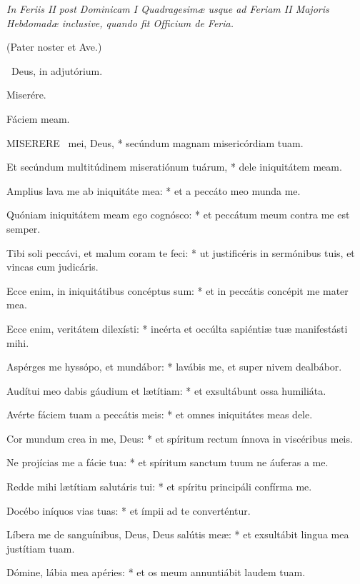 
\sectionornament


\textit{In Feriis II post Dominicam I Quadragesimæ usque ad Feriam II Majoris Hebdomadæ inclusive, quando fit Officium de Feria.}

(Pater noster et Ave.)

\V\ Deus, in adjutórium.

 Miserére. \textdagger


 Fáciem meam.


\lettrine[lines=2]{M}{ISERERE} \textdagger\ mei, Deus, * secúndum magnam misericórdiam tuam.

Et secúndum multitúdinem miseratiónum tuárum, * dele iniquitátem meam.

Amplius lava me ab iniquitáte mea: * et a peccáto meo munda me.

Quóniam iniquitátem meam ego cognósco: * et peccátum meum contra me est semper.

Tibi soli peccávi, et malum coram te feci: * ut justificéris in sermónibus tuis, et vincas cum judicáris.

Ecce enim, in iniquitátibus concéptus sum: * et in peccátis concépit me mater mea.

Ecce enim, veritátem dilexísti: * incérta et occúlta sapiéntiæ tuæ manifestásti mihi.

Aspérges me hyssópo, et mundábor: * lavábis me, et super nivem dealbábor.

Audítui meo dabis gáudium et lætítiam: * et exsultábunt ossa humiliáta.

Avérte fáciem tuam a peccátis meis: * et omnes iniquitátes meas dele.

Cor mundum crea in me, Deus: * et spíritum rectum ínnova in viscéribus meis.

Ne projícias me a fácie tua: * et spíritum sanctum tuum ne áuferas a me.

Redde mihi lætítiam salutáris tui: * et spíritu principáli confírma me.

Docébo iníquos vias tuas: * et ímpii ad te converténtur.

Líbera me de sanguínibus, Deus, Deus salútis meæ: * et exsultábit lingua mea justítiam tuam.

Dómine, lábia mea apéries: * et os meum annuntiábit laudem tuam.

